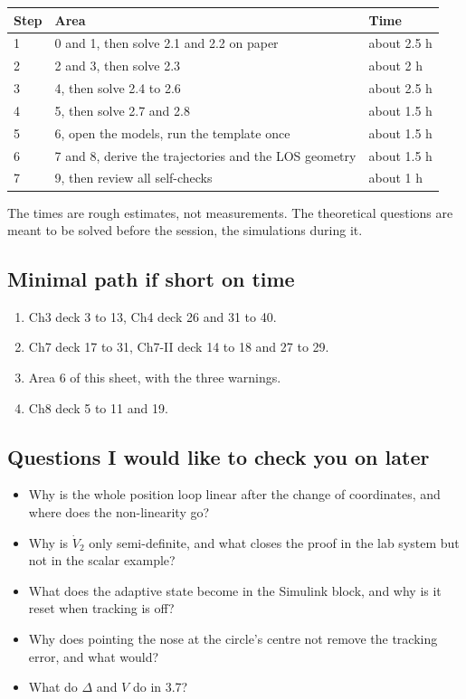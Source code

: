 \documentclass[10pt,a4paper]{article}
\begin{document}
\begin{tabularx}{\textwidth}{@{}l X l@{}}
\toprule
Step & Area & Time\\
\midrule
1 & 0 and 1, then solve 2.1 and 2.2 on paper & about 2.5 h\\
2 & 2 and 3, then solve 2.3 & about 2 h\\
3 & 4, then solve 2.4 to 2.6 & about 2.5 h\\
4 & 5, then solve 2.7 and 2.8 & about 1.5 h\\
5 & 6, open the models, run the template once & about 1.5 h\\
6 & 7 and 8, derive the trajectories and the LOS geometry & about 1.5 h\\
7 & 9, then review all self-checks & about 1 h\\
\bottomrule
\end{tabularx}
The times are rough estimates, not measurements.
The theoretical questions are meant to be solved before the session, the simulations during it.

\subsection*{Minimal path if short on time}

\begin{enumerate}[nosep,leftmargin=1.5em]
\item Ch3 deck 3 to 13, Ch4 deck 26 and 31 to 40.
\item Ch7 deck 17 to 31, Ch7-II deck 14 to 18 and 27 to 29.
\item Area 6 of this sheet, with the three warnings.
\item Ch8 deck 5 to 11 and 19.
\end{enumerate}

\subsection*{Questions I would like to check you on later}

\begin{itemize}
\item Why is the whole position loop linear after the change of coordinates, and where does the non-linearity go?
\item Why is $\dot V_2$ only semi-definite, and what closes the proof in the lab system but not in the scalar example?
\item What does the adaptive state become in the Simulink block, and why is it reset when tracking is off?
\item Why does pointing the nose at the circle's centre not remove the tracking error, and what would?
\item What do $\Delta$ and $V$ do in 3.7?
\end{itemize}
\end{document}
